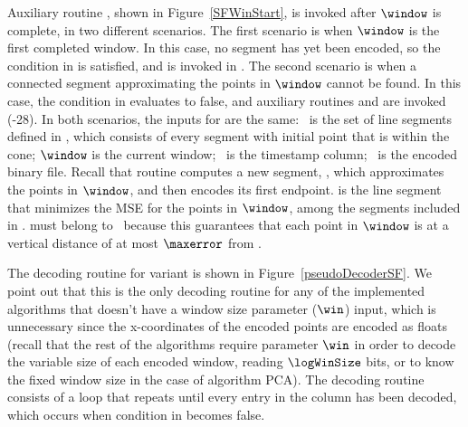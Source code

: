 Auxiliary routine \SFWinStart, shown in Figure~\ref{SFWinStart}, is invoked after $\window$ is complete, in two different scenarios. The first scenario is when $\window$ is the first completed window. In this case, no segment has yet been encoded, so the condition in  is satisfied, and \SFWinStart is invoked in . The second scenario is when a connected segment approximating the points in $\window$ cannot be found. In this case, the condition in  evaluates to false, and auxiliary routines \SFWinEnd and \SFWinStart are invoked (-28). In both scenarios, the inputs for \SFWinStart are the same: \segmentSet\ is the set of line segments defined in , which consists of every segment with initial point \intersection that is within the cone; $\window$ is the current window; \tscol\ is the timestamp column; \out\ is the encoded binary file. Recall that routine \SFWinStart computes a new segment, \segmentS, which approximates the points in $\window$, and then encodes its first endpoint. \segmentS is the line segment that minimizes the MSE for the points in $\window$, among the segments included in \segmentSet. \segmentS must belong to \segmentSet\ because this guarantees that each point in $\window$ is at a vertical distance of at most $\maxerror$ from \segmentS.


\vspace{+10pt}
The decoding routine for variant \maskalgo is shown in Figure~\ref{pseudoDecoderSF}. We point out that this is the only decoding routine for any of the implemented algorithms that doesn't have a window size parameter ($\win$) input, which is unnecessary since the x-coordinates of the encoded points are encoded as floats (recall that the rest of the algorithms require parameter $\win$ in order to decode the variable size of each encoded window, reading $\logWinSize$ bits, or to know the fixed window size in the case of algorithm PCA). The decoding routine consists of a loop that repeats until every entry in the column has been decoded, which occurs when condition in  becomes false. 


